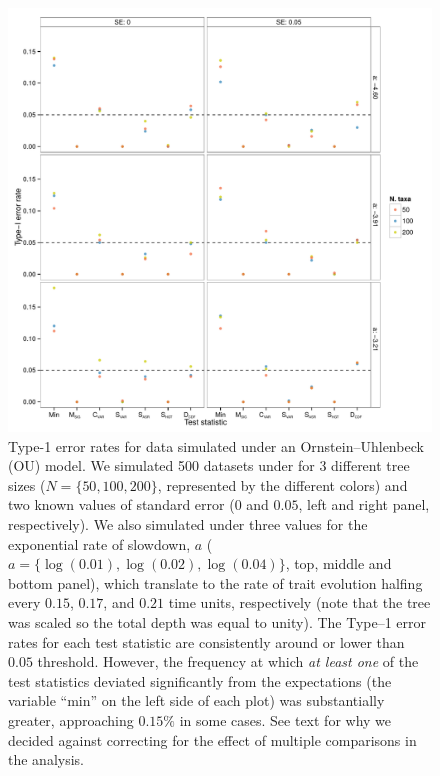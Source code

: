 \begin{figure}[p]
  \centering
  \includegraphics[width=\textwidth]{figs/eb-sim-res}
  \caption[Type-1 error rates for data simulated under Early Burst]{Type-1 error rates for data simulated under an Ornstein--Uhlenbeck (OU) model. We simulated 500 datasets under for 3 different tree sizes ($N=\lbrace 50, 100, 200 \rbrace$, represented by the different colors) and two known values of standard error ($0$ and $0.05$, left and right panel, respectively). We also simulated under three values for the exponential rate of slowdown, $a$ ($a=\lbrace \log(0.01),\log(0.02),\log(0.04) \rbrace$, top, middle and bottom panel), which translate to the rate of trait evolution halfing every $0.15$, $0.17$, and $0.21$ time units, respectively (note that the tree was scaled so the total depth was equal to unity).  The Type--1 error rates for each test statistic are consistently around or lower than $0.05$ threshold. However, the frequency at which \emph{at least one} of the test statistics deviated significantly from the expectations (the variable ``min'' on the left side of each plot) was substantially greater, approaching $0.15\%$ in some cases. See text for why we decided against correcting for the effect of multiple comparisons in the analysis.}
  \label{fig:eb-sim}
\end{figure}

